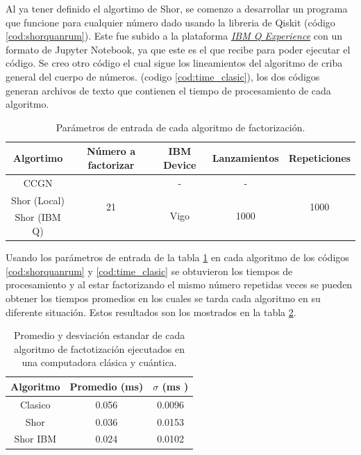 Al ya tener definido el algortimo de Shor, se comenzo a desarrollar un programa que funcione para cualquier número dado usando la libreria
de Qiskit (código \ref{cod:shorquanrum}). Este fue subido a la plataforma \href{https://quantum-computing.ibm.com/}{\textit{IBM Q Experience}} con un formato de 
Jupyter Notebook, ya que este es el que recibe para poder ejecutar el código. Se creo otro código el cual sigue los lineamientos del algoritmo de criba general del cuerpo de números.
(codigo \ref{cod:time_clasic}), los dos códigos generan archivos de texto que contienen el tiempo de procesamiento de cada algoritmo.
\begin{table}[H]
    \centering
    \begin{tabular}{|c|c|c|c|c|} \hline
        Algortimo & Número a factorizar & IBM Device & Lanzamientos & Repeticiones \\ \hline 
        CCGN & \multirow{3}{*}{21} & - & -& \multirow{3}{*}{1000}\\  \cline{1-1} \cline{3-4}
        Shor (Local) &  & \multirow{2}{*}{Vigo}& \multirow{2}{*}{1000}& \\ \cline{1-1}
        Shor (IBM Q) &  & &  &\\\hline
    \end{tabular}
    \caption{Parámetros de entrada de cada algoritmo de factorización.}
    \label{table:parametros}
\end{table}
Usando los parámetros de entrada de la tabla \ref{table:parametros} en cada algoritmo de los códigos \ref{cod:shorquanrum} y \ref{cod:time_clasic} se obtuvieron los tiempos de procesamiento y al estar
factorizando el mismo número repetidas veces se pueden obtener los tiempos promedios en los cuales se tarda cada algoritmo en su diferente situación. Estos resultados son los mostrados en la tabla \ref{tabla:resultados}.
\begin{table}[H]
    \centering
    \begin{tabular}{ccc} \hline
        Algoritmo & Promedio (ms) & $\sigma$ (ms ) \\ \hline
        Clasico & 0.056 & 0.0096 \\
        Shor &0.036& 0.0153 \\
        Shor IBM &0.024 &0.0102 \\ \hline
    \end{tabular}
    \caption{Promedio y desviación estandar de cada algoritmo de factotización ejecutados en una computadora clásica y cuántica.}
    \label{tabla:resultados}
\end{table}
